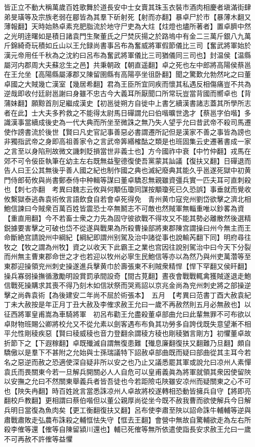 皆正立不動大稱萬歲百姓歌舞於道長安中士女賣其珠玉衣裝市酒肉相慶者塡滿街肆弟旻璜等及宗族老弱在郿皆為其羣下斫射死【射而亦翻】暴卓尸於市【暴薄木翻又薄報翻】天時始熱卓素充肥脂流於地守尸吏為大炷【炷燈也燼所著者】置卓臍中然之光明逹曙如是積日諸袁門生聚董氏之尸焚灰揚之於路塢中有金二三萬斤銀八九萬斤錦綺奇玩積如丘山以王允録尚書事呂布為奮威將軍假節儀比三司【奮武將軍始於漢元帝用任千秋為之沈約曰呂布為奮武將軍儀比三司猶儀同三司也】封温侯【温縣屬河内郡周大夫蘇忿生之邑】共秉朝政【朝直遥翻】卓之死也左中郎將高陽侯蔡邕在王允坐【高陽縣屬涿郡又陳留圉縣有高陽亭坐徂卧翻】聞之驚歎允勃然叱之曰董卓國之大賊幾亡漢室【幾居希翻】君為王臣所宜同疾而懷其私遇反相傷痛豈不共為逆哉即收付廷尉邕謝曰身雖不忠古今大義耳所厭聞口所常玩豈當背國而嚮卓也【背蒲妹翻】願黥首刖足繼成漢史【初邕徙朔方自徙中上書乞續漢書諸志蓋其所學所志者在此】士大夫多矜救之不能得太尉馬日磾謂允曰伯喈曠世逸才【蔡邕字伯喈】多識漢事當續成後史為一代大典而所坐至微誅之無乃失人望乎允曰昔武帝不殺司馬遷使作謗書流於後世【賢曰凡史官記事善惡必書謂遷所記但是漢家不善之事皆為謗也非獨指武帝之身即高祖善家令之言武帝筭緡榷酤之類是也班固集云史遷著書成一家之言至以身陷刑故微文譏刺貶損當世非義士也】方今國祚中衰【中竹仲翻】戎馬在郊不可令佞臣執筆在幼主左右既無益聖德復使吾黨蒙其訕議【復扶又翻】日磾退而告人曰王公其無後乎善人國之紀也制作國之典也滅紀廢典其能久乎邕遂死獄中初黄門侍郎荀攸與尚書鄭泰侍中种輯等謀曰董卓驕忍無親雖資彊兵實一匹夫耳可直刺殺也【刺七亦翻　考異曰魏志云攸與何顒伍瓊同謀按顒瓊死已久恐誤】事垂就而覺收攸繫獄泰逃犇袁術攸言語飲食自若會卓死得免　青州黄巾寇兖州劉岱欲擊之濟北相鮑信諫曰今賊衆百萬百姓皆震恐士卒無鬭志不可敵也然賊軍無輜重唯以鈔畧為資【重直用翻】今不若畜士衆之力先為固守彼欲戰不得攻又不能其勢必離散然後選精鋭據要害擊之可破也岱不從遂與戰果為所殺曹操部將東郡陳宫謂操曰州今無主而王命斷絶宫請說州中綱紀【綱紀即謂州别駕及治中諸從事也說輸芮翻下同】明府尋往牧之【牧之謂為州牧】資之以收天下此霸王之業也宫因往說别駕治中曰今天下分裂而州無主曹東郡命世之才也若迎以牧州必寧生民鮑信等亦以為然乃與州吏萬濳等至東郡迎操領兖州刺史操遂進兵擊黄巾於壽張東不利賊衆精悍【悍下罕翻又侯旰翻】操兵寡弱操撫循激勵明設賞罰承間設奇【間古莧翻】晝夜會戰戰輒禽獲賊遂退走鮑信戰死操購求其喪不得乃刻木如信狀祭而哭焉詔以京兆金尚為兖州刺史將之部操逆擊之尚犇袁術【為後建安二年尚不屈於術張本】　五月　【考異曰范書丁酉大赦袁紀丁未大赦按是年正月丁丑大赦及李傕求赦王允曰一歲不再赦然則五月必無赦也】以征西將軍皇甫嵩為車騎將軍　初呂布勸王允盡殺董卓部曲允曰此輩無罪不可布欲以卓財物班賜公卿將校允又不從允素以劍客遇布布負其功勞多自誇伐既失意望漸不相平允性剛稜疾惡【賢曰稜威稜也音力登翻余謂稜方稜也剛稜猶言剛方】初懼董卓故折節下之【下遐稼翻】卓既殱滅自謂無復患難【殱息廉翻復扶又翻難乃旦翻】頗自驕傲以是羣下不甚附之允始與士孫瑞議特下詔赦卓部曲既而疑曰部曲從其主耳今若名之惡逆而赦之恐適使深自疑非所以安之也乃止又議悉罷其軍或說允曰凉州人素憚袁氏而畏關東今若一旦解兵開關必人人自危可以皇甫義眞為將軍就領其衆因使留陜以安撫之允曰不然關東舉義兵者皆吾徒也今若距險屯陜雖安凉州而疑關東之心不可也【陜失冉翻】時百姓訛言當悉誅凉州人卓故將校遂轉相恐動皆擁兵自守【將即亮翻校戶教翻】更相謂曰蔡伯喈但以董公親厚尚從坐今既不赦我曹而欲使解兵今日解兵明日當復為魚肉矣【更工衡翻復扶又翻】呂布使李肅至陜以詔命誅牛輔輔等逆與肅戰肅敗走弘農布誅殺之輔恇怯失守【恇去王翻】會營中無故自驚輔欲走為左右所殺李傕等還【傕等自陳留潁川還也】輔已死傕等無所依遣使詣長安求赦王允曰一歲不可再赦不許傕等益懼